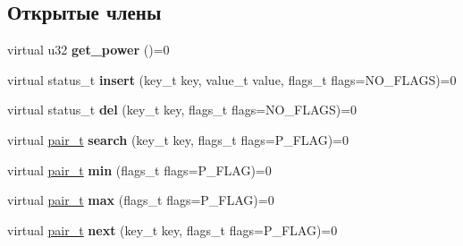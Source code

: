 \subsection*{Открытые члены}
\begin{DoxyCompactItemize}
\item 
\mbox{\label{class_s_p_u_1_1_abstract_structure_aad5e68309c8b463aa12642388f42d822}} 
virtual u32 {\bfseries get\+\_\+power} ()=0
\item 
\mbox{\label{class_s_p_u_1_1_abstract_structure_a8c46ff9efeee7a4ff6cdf54e5190d818}} 
virtual status\+\_\+t {\bfseries insert} (key\+\_\+t key, value\+\_\+t value, flags\+\_\+t flags=N\+O\+\_\+\+F\+L\+A\+GS)=0
\item 
\mbox{\label{class_s_p_u_1_1_abstract_structure_a948685f0124a3a0e49241dae8140e933}} 
virtual status\+\_\+t {\bfseries del} (key\+\_\+t key, flags\+\_\+t flags=N\+O\+\_\+\+F\+L\+A\+GS)=0
\item 
\mbox{\label{class_s_p_u_1_1_abstract_structure_a3b0f4c97011b6c5b9bd54bf3a6622cf3}} 
virtual \hyperlink{struct_s_p_u_1_1pair__containter}{pair\+\_\+t} {\bfseries search} (key\+\_\+t key, flags\+\_\+t flags=P\+\_\+\+F\+L\+AG)=0
\item 
\mbox{\label{class_s_p_u_1_1_abstract_structure_a6613408cebd3a985023433734f32fcf0}} 
virtual \hyperlink{struct_s_p_u_1_1pair__containter}{pair\+\_\+t} {\bfseries min} (flags\+\_\+t flags=P\+\_\+\+F\+L\+AG)=0
\item 
\mbox{\label{class_s_p_u_1_1_abstract_structure_a7f0a85be53dd8b365fbad64aa5a5f3ee}} 
virtual \hyperlink{struct_s_p_u_1_1pair__containter}{pair\+\_\+t} {\bfseries max} (flags\+\_\+t flags=P\+\_\+\+F\+L\+AG)=0
\item 
\mbox{\label{class_s_p_u_1_1_abstract_structure_ac042dc48dd2b6bf63fc798ea291b4ce7}} 
virtual \hyperlink{struct_s_p_u_1_1pair__containter}{pair\+\_\+t} {\bfseries next} (key\+\_\+t key, flags\+\_\+t flags=P\+\_\+\+F\+L\+AG)=0
\item 
\mbox{\label{class_s_p_u_1_1_abstract_structure_a5569186fd80dbfe74b13c274ffac8e41}} 

\end{DoxyCompactItemize}
